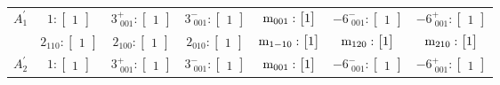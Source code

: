 \documentclass[fleqn,8pt,landscape]{jsarticle}
\begin{document}
\begin{longtable}{ccccccc}
$ A_{1}^{\prime} $ & $ 1:\begin{bmatrix} 1 \end{bmatrix} $ & $ 3^{+}_{\,\,001}:\begin{bmatrix} 1 \end{bmatrix} $ & $ 3^{-}_{\,\,001}:\begin{bmatrix} 1 \end{bmatrix} $ & $ {\rm m}_{001}:\begin{bmatrix} 1 \end{bmatrix} $ & $ -6^{-}_{\,\,001}:\begin{bmatrix} 1 \end{bmatrix} $ & $ -6^{+}_{\,\,001}:\begin{bmatrix} 1 \end{bmatrix} $ \\
& $ 2{}_{110}:\begin{bmatrix} 1 \end{bmatrix} $ & $ 2{}_{100}:\begin{bmatrix} 1 \end{bmatrix} $ & $ 2{}_{010}:\begin{bmatrix} 1 \end{bmatrix} $ & $ {\rm m}_{1-10}:\begin{bmatrix} 1 \end{bmatrix} $ & $ {\rm m}_{120}:\begin{bmatrix} 1 \end{bmatrix} $ & $ {\rm m}_{210}:\begin{bmatrix} 1 \end{bmatrix} $ \\ \hline
$ A_{2}^{\prime} $ & $ 1:\begin{bmatrix} 1 \end{bmatrix} $ & $ 3^{+}_{\,\,001}:\begin{bmatrix} 1 \end{bmatrix} $ & $ 3^{-}_{\,\,001}:\begin{bmatrix} 1 \end{bmatrix} $ & $ {\rm m}_{001}:\begin{bmatrix} 1 \end{bmatrix} $ & $ -6^{-}_{\,\,001}:\begin{bmatrix} 1 \end{bmatrix} $ & $ -6^{+}_{\,\,001}:\begin{bmatrix} 1 \end{bmatrix} $ \\

\end{longtable}
\end{document}
